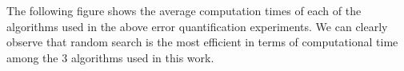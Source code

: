 


The following figure shows the average computation times of each of the algorithms used in the above error quantification experiments. We can clearly observe that random search is the most efficient in terms of computational time among the 3 algorithms used in this work.

